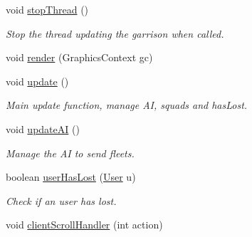 \begin{DoxyCompactItemize}
\mbox{\label{classfr_1_1groupe40_1_1projet_1_1model_1_1board_1_1_galaxy_ae745fbb5e9d4a2b6a524ca30cd39c53c}} 
void \mbox{\hyperlink{classfr_1_1groupe40_1_1projet_1_1model_1_1board_1_1_galaxy_ae745fbb5e9d4a2b6a524ca30cd39c53c}{stop\+Thread}} ()
\begin{DoxyCompactList}\small\item\em Stop the thread updating the garrison when called. \end{DoxyCompactList}\item 
void \mbox{\hyperlink{classfr_1_1groupe40_1_1projet_1_1model_1_1board_1_1_galaxy_ab3b17b740db263c25b80f7b9e6f33d24}{render}} (Graphics\+Context gc)
\item 
\mbox{\label{classfr_1_1groupe40_1_1projet_1_1model_1_1board_1_1_galaxy_a1c65b580653742a987f3288b768533c8}} 
void \mbox{\hyperlink{classfr_1_1groupe40_1_1projet_1_1model_1_1board_1_1_galaxy_a1c65b580653742a987f3288b768533c8}{update}} ()
\begin{DoxyCompactList}\small\item\em Main update function, manage AI, squads and has\+Lost. \end{DoxyCompactList}\item 
\mbox{\label{classfr_1_1groupe40_1_1projet_1_1model_1_1board_1_1_galaxy_a32edba917f025f3ed2ff6d4723401dd1}} 
void \mbox{\hyperlink{classfr_1_1groupe40_1_1projet_1_1model_1_1board_1_1_galaxy_a32edba917f025f3ed2ff6d4723401dd1}{update\+AI}} ()
\begin{DoxyCompactList}\small\item\em Manage the AI to send fleets. \end{DoxyCompactList}\item 
boolean \mbox{\hyperlink{classfr_1_1groupe40_1_1projet_1_1model_1_1board_1_1_galaxy_ad3ec27b73e7f093df14ca096395d10c2}{user\+Has\+Lost}} (\mbox{\hyperlink{classfr_1_1groupe40_1_1projet_1_1client_1_1_user}{User}} u)
\begin{DoxyCompactList}\small\item\em Check if an user has lost. \end{DoxyCompactList}\item 
void \mbox{\hyperlink{classfr_1_1groupe40_1_1projet_1_1model_1_1board_1_1_galaxy_af4b01f22d35d56f0b775c9244eff5acf}{client\+Scroll\+Handler}} (int action)

\end{DoxyCompactItemize}

